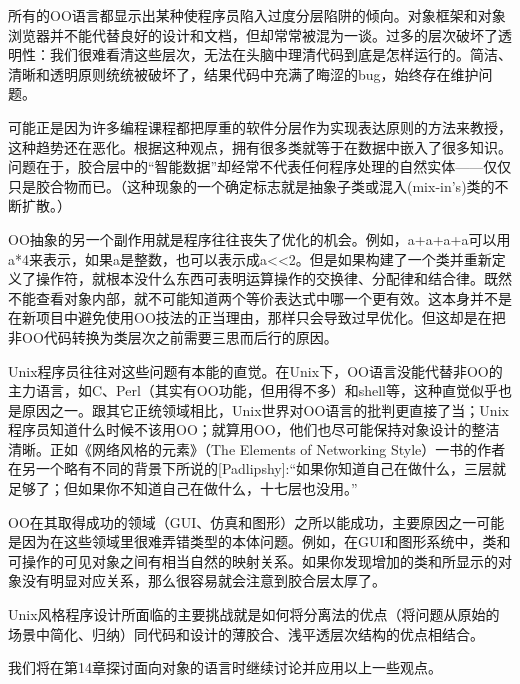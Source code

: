 \documentclass[12pt,oneside]{book}
\begin{document}
\begin{common-format}
所有的OO语言都显示出某种使程序员陷入过度分层陷阱的倾向。对象框架和对象浏览器并不能代替良好的设计和文档，但却常常被混为一谈。过多的层次破坏了透明性：我们很难看清这些层次，无法在头脑中理清代码到底是怎样运行的。简洁、清晰和透明原则统统被破坏了，结果代码中充满了晦涩的bug，始终存在维护问题。

可能正是因为许多编程课程都把厚重的软件分层作为实现表达原则的方法来教授，这种趋势还在恶化。根据这种观点，拥有很多类就等于在数据中嵌入了很多知识。问题在于，胶合层中的“智能数据”却经常不代表任何程序处理的自然实体——仅仅只是胶合物而已。（这种现象的一个确定标志就是抽象子类或混入(mix-in's)类的不断扩散。）

OO抽象的另一个副作用就是程序往往丧失了优化的机会。例如，a+a+a+a可以用a*4来表示，如果a是整数，也可以表示成a<<2。但是如果构建了一个类并重新定义了操作符，就根本没什么东西可表明运算操作的交换律、分配律和结合律。既然不能查看对象内部，就不可能知道两个等价表达式中哪一个更有效。这本身并不是在新项目中避免使用OO技法的正当理由，那样只会导致过早优化。但这却是在把非OO代码转换为类层次之前需要三思而后行的原因。

Unix程序员往往对这些问题有本能的直觉。在Unix下，OO语言没能代替非OO的主力语言，如C、Perl（其实有OO功能，但用得不多）和shell等，这种直觉似乎也是原因之一。跟其它正统领域相比，Unix世界对OO语言的批判更直接了当；Unix程序员知道什么时候不该用OO；就算用OO，他们也尽可能保持对象设计的整洁清晰。正如《网络风格的元素》（The Elements of Networking Style）一书的作者在另一个略有不同的背景下所说的[Padlipshy]:“如果你知道自己在做什么，三层就足够了；但如果你不知道自己在做什么，十七层也没用。”

OO在其取得成功的领域（GUI、仿真和图形）之所以能成功，主要原因之一可能是因为在这些领域里很难弄错类型的本体问题。例如，在GUI和图形系统中，类和可操作的可见对象之间有相当自然的映射关系。如果你发现增加的类和所显示的对象没有明显对应关系，那么很容易就会注意到胶合层太厚了。

Unix风格程序设计所面临的主要挑战就是如何将分离法的优点（将问题从原始的场景中简化、归纳）同代码和设计的薄胶合、浅平透层次结构的优点相结合。

我们将在第14章探讨面向对象的语言时继续讨论并应用以上一些观点。



\end{common-format}
\end{document}
